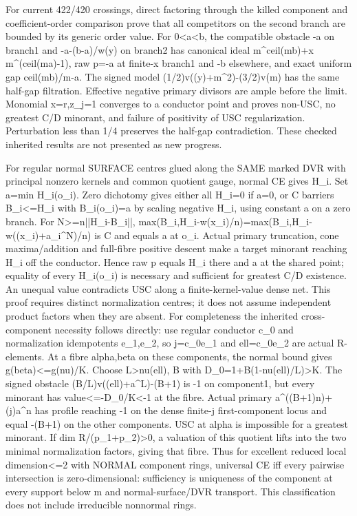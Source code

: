 \documentclass[11pt]{article}
\begin{document}
For current 422/420 crossings, direct factoring through the killed component and coefficient-order comparison prove that all competitors on the second branch are bounded by its generic order value. For 0\textless{}a\textless{}b, the compatible obstacle -a on branch1 and -a-(b-a)/w(y) on branch2 has canonical ideal m\textasciicircum{}ceil(mb)+x m\textasciicircum{}(ceil(ma)-1), raw p=-a at finite-x branch1 and -b elsewhere, and exact uniform gap ceil(mb)/m-a. The signed model (1/2)v((y)+m\textasciicircum{}2)-(3/2)v(m) has the same half-gap filtration. Effective negative primary divisors are ample before the limit. Monomial x=r,z\_j=1 converges to a conductor point and proves non-USC, no greatest C/D minorant, and failure of positivity of USC regularization. Perturbation less than 1/4 preserves the half-gap contradiction. These checked inherited results are not presented as new progress.

For regular normal SURFACE centres glued along the SAME marked DVR with principal nonzero kernels and common quotient gauge, normal CE gives H\_i. Set a=min H\_i(o\_i). Zero dichotomy gives either all H\_i=0 if a=0, or C barriers B\_i\textless{}=H\_i with B\_i(o\_i)=a by scaling negative H\_i, using constant a on a zero branch. For N\textgreater{}=n||H\_i-B\_i||, max(B\_i,H\_i-w(x\_i)/n)=max(B\_i,H\_i-w((x\_i)+a\_i\textasciicircum{}N)/n) is C and equals a at o\_i. Actual primary truncation, cone maxima/addition and full-fibre positive descent make a target minorant reaching H\_i off the conductor. Hence raw p equals H\_i there and a at the shared point; equality of every H\_i(o\_i) is necessary and sufficient for greatest C/D existence. An unequal value contradicts USC along a finite-kernel-value dense net. This proof requires distinct normalization centres; it does not assume independent product factors when they are absent. For completeness the inherited cross-component necessity follows directly: use regular conductor c\_0 and normalization idempotents e\_1,e\_2, so j=c\_0e\_1 and ell=c\_0e\_2 are actual R-elements. At a fibre alpha,beta on these components, the normal bound gives g(beta)\textless{}=g(nu)/K. Choose L\textgreater{}nu(ell), B with D\_0=1+B(1-nu(ell)/L)\textgreater{}K. The signed obstacle (B/L)v((ell)+a\textasciicircum{}L)-(B+1) is -1 on component1, but every minorant has value\textless{}=-D\_0/K\textless{}-1 at the fibre. Actual primary a\textasciicircum{}((B+1)n)+(j)a\textasciicircum{}n has profile reaching -1 on the dense finite-j first-component locus and equal -(B+1) on the other components. USC at alpha is impossible for a greatest minorant. If dim R/(p\_1+p\_2)\textgreater{}0, a valuation of this quotient lifts into the two minimal normalization factors, giving that fibre. Thus for excellent reduced local dimension\textless{}=2 with NORMAL component rings, universal CE iff every pairwise intersection is zero-dimensional: sufficiency is uniqueness of the component at every support below m and normal-surface/DVR transport. This classification does not include irreducible nonnormal rings.
\end{document}
